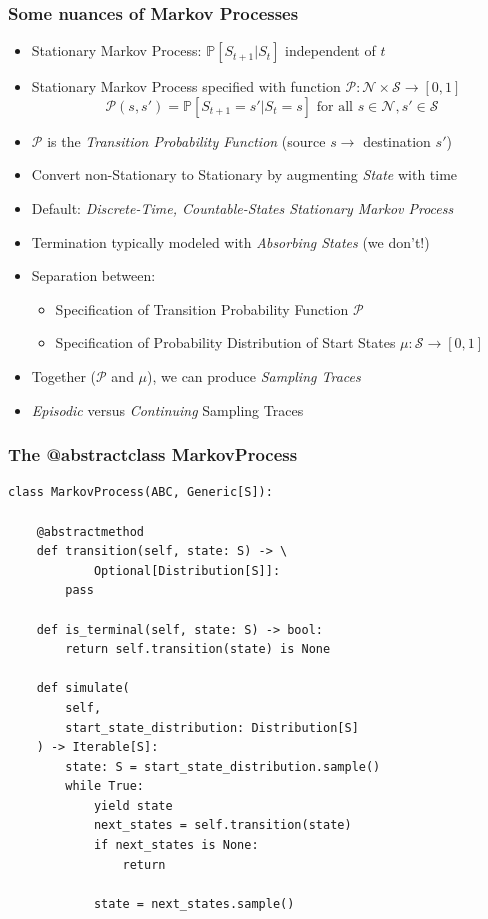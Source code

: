 \documentclass[handout]{beamer}
\begin{document}
\begin{frame}
\frametitle{Some nuances of Markov Processes}
\pause
\begin{itemize}[<+->]
\item Stationary Markov Process: $\mathbb{P}[S_{t+1}|S_t]$ independent of $t$
\item Stationary Markov Process specified with function $\mathcal{P}: \mathcal{N} \times \mathcal{S} \rightarrow [0,1]$
$$\mathcal{P}(s, s') = \mathbb{P}[S_{t+1}=s'|S_t=s] \text{ for all } s \in \mathcal{N}, s' \in \mathcal{S}$$
\item $\mathcal{P}$ is the {\em Transition Probability Function} (source $s \rightarrow$ destination $s'$)
\item Convert non-Stationary to Stationary by augmenting {\em State} with time
\item Default: {\em Discrete-Time, Countable-States Stationary Markov Process}
\item Termination typically modeled with {\em Absorbing States} (we don't!)
\item Separation between:
\begin{itemize}
\item Specification of Transition Probability Function $\mathcal{P}$
\item Specification of Probability Distribution of Start States $\mu: \mathcal{S} \rightarrow [0, 1]$ 
\end{itemize}
\item Together ($\mathcal{P}$ and $\mu$), we can produce {\em Sampling Traces}
\item {\em Episodic} versus {\em Continuing} Sampling Traces
\end{itemize}
\end{frame}

\begin{frame}[fragile]
\frametitle{The @abstractclass MarkovProcess}
\pause
\begin{lstlisting}
class MarkovProcess(ABC, Generic[S]):

    @abstractmethod
    def transition(self, state: S) -> \
            Optional[Distribution[S]]:
        pass

    def is_terminal(self, state: S) -> bool:
        return self.transition(state) is None

    def simulate(
        self,
        start_state_distribution: Distribution[S]
    ) -> Iterable[S]:
        state: S = start_state_distribution.sample()
        while True:
            yield state
            next_states = self.transition(state)
            if next_states is None:
                return

            state = next_states.sample()
\end{lstlisting}
\end{frame}
\end{document}
